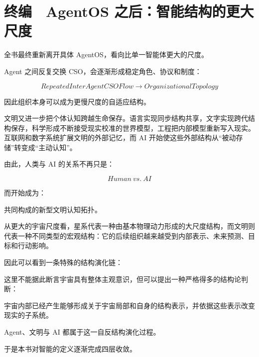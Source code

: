 \part{终编　AgentOS 之后：智能结构的更大尺度}
全书最终重新离开具体 AgentOS，看向比单一智能体更大的尺度。

Agent 之间反复交换 CSO，会逐渐形成稳定角色、协议和制度：

$$
RepeatedInterAgentCSOFlow
\rightarrow
OrganizationalTopology
$$

因此组织本身可以成为更慢尺度的自适应结构。

文明又进一步把个体认知跨越生命保存。语言实现同步结构共享，文字实现跨代结构保存，科学形成不断接受现实校准的世界模型，工程把内部模型重新写入现实。互联网和数字系统扩展文明的外部记忆，而 AI 开始使这些外部结构从“被动存储”转变成“主动认知”。

由此，人类与 AI 的关系不再只是：

$$
Human\ vs.\ AI
$$

而开始成为：

\begin{statementbox}
\centering
{}
\end{statementbox}

共同构成的新型文明认知拓扑。

从更大的宇宙尺度看，星系代表一种由基本物理动力形成的大尺度结构，而文明则代表一种不同类型的宏观结构：它的后续组织越来越受到内部表示、未来预测、目标和行动影响。

因此可以看到一条特殊的结构演化链：

\begin{statementbox}
\centering
{}
\end{statementbox}

这里不能据此断言宇宙具有整体主观意识，但可以提出一种严格得多的结构论判断：

\begin{proposition*}
宇宙内部已经产生能够形成关于宇宙局部和自身的结构表示，并依据这些表示改变现实的子系统。
\end{proposition*}

Agent、文明与 AI 都属于这一自反结构演化过程。

于是本书对智能的定义逐渐完成四层收敛。

